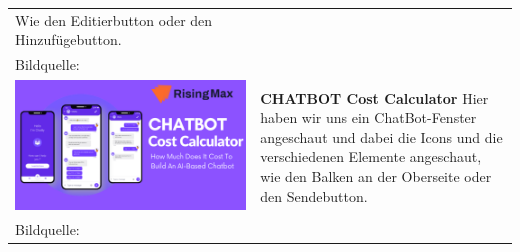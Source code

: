 \begin{tabular}{C{6cm}  L{7cm}}
    Wie den Editierbutton oder den Hinzufügebutton.                                                                                  \\
    Bildquelle:\cite{briar} \newline                                                                                                 \\
    \includegraphics[width=\linewidth]{bilder/research pic/chatbot-cost-calculator.png} & \textbf{CHATBOT Cost Calculator} \newline
    Hier haben wir uns ein ChatBot-Fenster angeschaut und dabei die Icons und die
    verschiedenen Elemente angeschaut, wie den Balken an der Oberseite oder den Sendebutton.                                         \\
    Bildquelle:\cite{chatbotcostcalc} \newline
\end{tabular}

